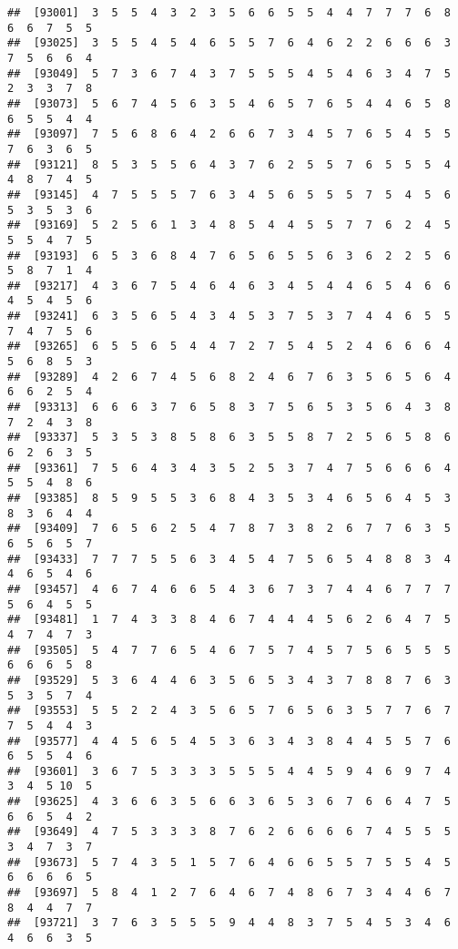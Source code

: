 \documentclass[
]{book}
\begin{document}
\begin{verbatim}
##  [93001]  3  5  5  4  3  2  3  5  6  6  5  5  4  4  7  7  7  6  8  6  6  7  5  5
##  [93025]  3  5  5  4  5  4  6  5  5  7  6  4  6  2  2  6  6  6  3  7  5  6  6  4
##  [93049]  5  7  3  6  7  4  3  7  5  5  5  4  5  4  6  3  4  7  5  2  3  3  7  8
##  [93073]  5  6  7  4  5  6  3  5  4  6  5  7  6  5  4  4  6  5  8  6  5  5  4  4
##  [93097]  7  5  6  8  6  4  2  6  6  7  3  4  5  7  6  5  4  5  5  7  6  3  6  5
##  [93121]  8  5  3  5  5  6  4  3  7  6  2  5  5  7  6  5  5  5  4  4  8  7  4  5
##  [93145]  4  7  5  5  5  7  6  3  4  5  6  5  5  5  7  5  4  5  6  5  3  5  3  6
##  [93169]  5  2  5  6  1  3  4  8  5  4  4  5  5  7  7  6  2  4  5  5  5  4  7  5
##  [93193]  6  5  3  6  8  4  7  6  5  6  5  5  6  3  6  2  2  5  6  5  8  7  1  4
##  [93217]  4  3  6  7  5  4  6  4  6  3  4  5  4  4  6  5  4  6  6  4  5  4  5  6
##  [93241]  6  3  5  6  5  4  3  4  5  3  7  5  3  7  4  4  6  5  5  7  4  7  5  6
##  [93265]  6  5  5  6  5  4  4  7  2  7  5  4  5  2  4  6  6  6  4  5  6  8  5  3
##  [93289]  4  2  6  7  4  5  6  8  2  4  6  7  6  3  5  6  5  6  4  6  6  2  5  4
##  [93313]  6  6  6  3  7  6  5  8  3  7  5  6  5  3  5  6  4  3  8  7  2  4  3  8
##  [93337]  5  3  5  3  8  5  8  6  3  5  5  8  7  2  5  6  5  8  6  6  2  6  3  5
##  [93361]  7  5  6  4  3  4  3  5  2  5  3  7  4  7  5  6  6  6  4  5  5  4  8  6
##  [93385]  8  5  9  5  5  3  6  8  4  3  5  3  4  6  5  6  4  5  3  8  3  6  4  4
##  [93409]  7  6  5  6  2  5  4  7  8  7  3  8  2  6  7  7  6  3  5  6  5  6  5  7
##  [93433]  7  7  7  5  5  6  3  4  5  4  7  5  6  5  4  8  8  3  4  4  6  5  4  6
##  [93457]  4  6  7  4  6  6  5  4  3  6  7  3  7  4  4  6  7  7  7  5  6  4  5  5
##  [93481]  1  7  4  3  3  8  4  6  7  4  4  4  5  6  2  6  4  7  5  4  7  4  7  3
##  [93505]  5  4  7  7  6  5  4  6  7  5  7  4  5  7  5  6  5  5  5  6  6  6  5  8
##  [93529]  5  3  6  4  4  6  3  5  6  5  3  4  3  7  8  8  7  6  3  5  3  5  7  4
##  [93553]  5  5  2  2  4  3  5  6  5  7  6  5  6  3  5  7  7  6  7  7  5  4  4  3
##  [93577]  4  4  5  6  5  4  5  3  6  3  4  3  8  4  4  5  5  7  6  6  5  5  4  6
##  [93601]  3  6  7  5  3  3  3  5  5  5  4  4  5  9  4  6  9  7  4  3  4  5 10  5
##  [93625]  4  3  6  6  3  5  6  6  3  6  5  3  6  7  6  6  4  7  5  6  6  5  4  2
##  [93649]  4  7  5  3  3  3  8  7  6  2  6  6  6  6  7  4  5  5  5  3  4  7  3  7
##  [93673]  5  7  4  3  5  1  5  7  6  4  6  6  5  5  7  5  5  4  5  6  6  6  6  5
##  [93697]  5  8  4  1  2  7  6  4  6  7  4  8  6  7  3  4  4  6  7  8  4  4  7  7
##  [93721]  3  7  6  3  5  5  5  9  4  4  8  3  7  5  4  5  3  4  6  4  6  6  3  5

\end{verbatim}
\end{document}
